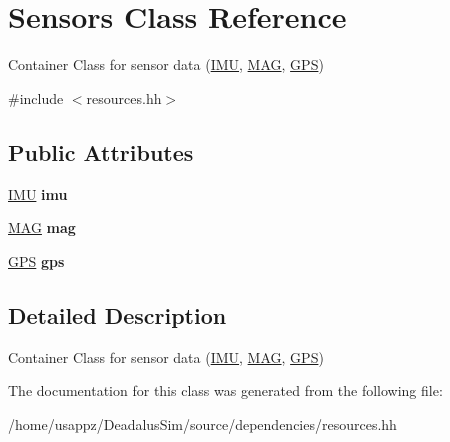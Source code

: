 \hypertarget{classSensors}{\section{\-Sensors \-Class \-Reference}
\label{classSensors}
}


\-Container \-Class for sensor data (\hyperlink{classIMU}{\-I\-M\-U}, \hyperlink{classMAG}{\-M\-A\-G}, \hyperlink{classGPS}{\-G\-P\-S})  




{\ttfamily \#include $<$resources.\-hh$>$}

\subsection*{\-Public \-Attributes}
\begin{DoxyCompactItemize}
\item 
\hypertarget{classSensors_a941f353c9788c592575d2267860793db}{\hyperlink{classIMU}{\-I\-M\-U} {\bfseries imu}}\label{classSensors_a941f353c9788c592575d2267860793db}

\item 
\hypertarget{classSensors_ace2d0bed5dc417f666b1af05f1985852}{\hyperlink{classMAG}{\-M\-A\-G} {\bfseries mag}}\label{classSensors_ace2d0bed5dc417f666b1af05f1985852}

\item 
\hypertarget{classSensors_a6d327380100530f7221d0a75506f03f4}{\hyperlink{classGPS}{\-G\-P\-S} {\bfseries gps}}\label{classSensors_a6d327380100530f7221d0a75506f03f4}

\end{DoxyCompactItemize}


\subsection{\-Detailed \-Description}
\-Container \-Class for sensor data (\hyperlink{classIMU}{\-I\-M\-U}, \hyperlink{classMAG}{\-M\-A\-G}, \hyperlink{classGPS}{\-G\-P\-S}) 

\-The documentation for this class was generated from the following file\-:\begin{DoxyCompactItemize}
\item 
/home/usappz/\-Deadalus\-Sim/source/dependencies/resources.\-hh\end{DoxyCompactItemize}

